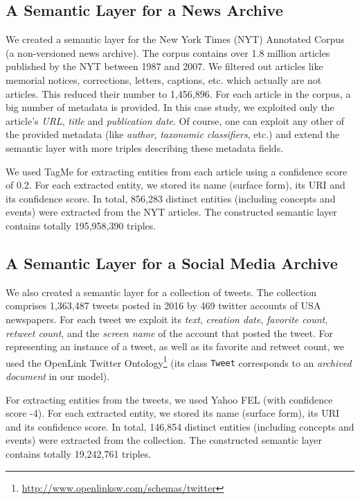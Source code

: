 \documentclass{libtex/sig-alternate-05-2015}
\begin{document}
\subsection{A Semantic Layer for a News Archive}
\label{newsArch}
We created a semantic layer for the
New York Times (NYT) Annotated Corpus \cite{sandhaus2008new}
(a non-versioned news archive).
The corpus contains over 1.8 million articles published by
the NYT between 1987 and 2007.
We filtered out articles like memorial notices, corrections,
letters, captions, etc. which actually are not articles.
This reduced their number to 1,456,896.
For each article in the corpus,
a big number of metadata is provided.
In this case study, we exploited only the article's {\em URL},
{\em title} and {\em publication date}.
Of course, one can exploit any other
of the provided metadata (like {\em author},
{\em taxonomic classifiers}, etc.) and extend the
semantic layer with more triples describing these metadata fields.

We used TagMe \cite{ferragina2010tagme} for extracting
entities from each article using a
confidence score of 0.2.
For each extracted entity, we stored its name (surface form),
its URI and its confidence score.
In total, 856,283 distinct entities
(including concepts and events)
were extracted from the NYT articles.
The constructed semantic layer contains totally
195,958,390 triples.



\subsection{A Semantic Layer for a Social Media Archive}
\label{tweetsArch}
We also created a semantic layer for a collection of tweets.
The collection comprises 1,363,487 tweets
posted in 2016 by 469 twitter accounts of USA newspapers.
For each tweet we exploit its {\em text}, {\em creation date},
{\em favorite count}, {\em retweet count}, and
the {\em screen name} of the account that posted the tweet.
For representing an instance of a tweet,
as well as its favorite and retweet count,
we used the OpenLink Twitter Ontology\footnote{\url{http://www.openlinksw.com/schemas/twitter}}
(its class {\tt Tweet} corresponds to an {\em archived document} in our model).

For extracting entities from the tweets,
we used Yahoo FEL (with confidence score -4).
For each extracted entity, we stored its name (surface form),
its URI and its confidence score.
In total, 146,854 distinct entities (including concepts and events)
were extracted from the collection.
The constructed semantic layer contains totally 19,242,761 triples.
\end{document}
